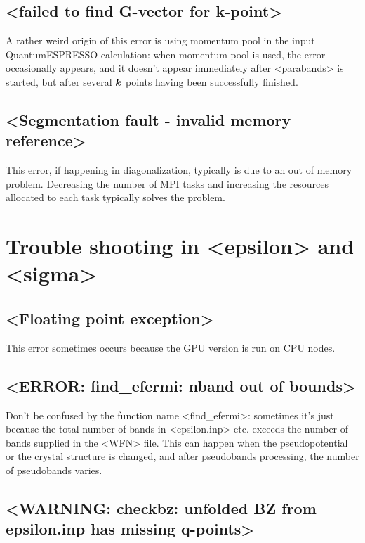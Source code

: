 \documentclass[hyperref, a4paper, 12pt]{report}
\def\texttt#1{<#1>}%
\newcommand{\shortcode}[1]{\texttt{#1}}
\begin{document}
\subsection{\shortcode{failed to find G-vector for k-point}}

A rather weird origin of this error 
is using momentum pool in the input QuantumESPRESSO calculation:
when momentum pool is used, 
the error occasionally appears, 
and it doesn't appear immediately after \shortcode{parabands} is started, 
but after several $\vb*{k}$ points having been successfully finished.

\subsection{\shortcode{Segmentation fault - invalid memory reference}}

This error, if happening in diagonalization, typically is due to an out of memory problem.
Decreasing the number of MPI tasks and increasing the resources allocated to each task typically solves the problem.

\section{Trouble shooting in \shortcode{epsilon} and \shortcode{sigma}}

\subsection{\shortcode{Floating point exception}}

This error sometimes occurs because the GPU version is run on CPU nodes.

\subsection{\shortcode{ERROR: find_efermi: nband out of bounds}}

Don't be confused by the function name \shortcode{find_efermi}:
sometimes it's just because the total number of bands in \shortcode{epsilon.inp} etc.
exceeds the number of bands supplied in the \shortcode{WFN} file.
This can happen when the pseudopotential or the crystal structure is changed,
and after pseudobands processing, the number of pseudobands varies.

\subsection{\shortcode{WARNING: checkbz: unfolded BZ from epsilon.inp has missing q-points}}
\end{document}
